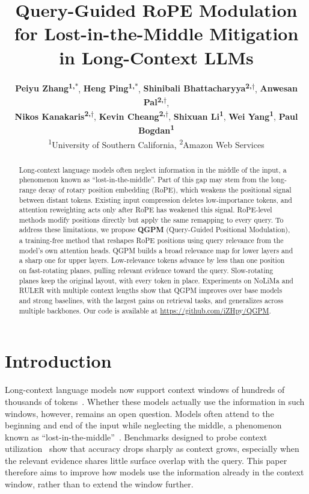 \documentclass[11pt]{article}
\title{Query-Guided RoPE Modulation for Lost-in-the-Middle Mitigation in Long-Context LLMs}
\author{
 \textbf{Peiyu Zhang\textsuperscript{1,$\ast$}},
 \textbf{Heng Ping\textsuperscript{1,$\ast$}},
 \textbf{Shinibali Bhattacharyya\textsuperscript{2,$\dagger$}},
 \textbf{Anwesan Pal\textsuperscript{2,$\dagger$}},
 \\
 \textbf{Nikos Kanakaris\textsuperscript{2,$\dagger$}},
 \textbf{Kevin Cheang\textsuperscript{2,$\dagger$}},
 \textbf{Shixuan Li\textsuperscript{1}},
 \textbf{Wei Yang\textsuperscript{1}},
 \textbf{Paul Bogdan\textsuperscript{1}}
\\
 \textsuperscript{1}University of Southern California,
 \textsuperscript{2}Amazon Web Services
}
\begin{document}
\maketitle
\renewcommand{\thefootnote}{$\ast$}
\renewcommand{\thefootnote}{$\dagger$}
\renewcommand{\thefootnote}{\arabic{footnote}}

\begin{abstract}
Long-context language models often neglect information in the middle of the input, a phenomenon known as ``lost-in-the-middle''. Part of this gap may stem from the long-range decay of rotary position embedding (RoPE), which weakens the positional signal between distant tokens. Existing input compression deletes low-importance tokens, and attention reweighting acts only after RoPE has weakened this signal. RoPE-level methods modify positions directly but apply the same remapping to every query. To address these limitations, we propose \textbf{QGPM} (Query-Guided Positional Modulation), a training-free method that reshapes RoPE positions using query relevance from the model's own attention heads. QGPM builds a broad relevance map for lower layers and a sharp one for upper layers. Low-relevance tokens advance by less than one position on fast-rotating planes, pulling relevant evidence toward the query. Slow-rotating planes keep the original layout, with every token in place. Experiments on NoLiMa and RULER with multiple context lengths show that QGPM improves over base models and strong baselines, with the largest gains on retrieval tasks, and generalizes across multiple backbones. Our code is available at \url{https://github.com/iZHpy/QGPM}.
\end{abstract}

\section{Introduction}

Long-context language models now support context windows of hundreds of thousands of tokens~\citep{achiam2023gpt,grattafiori2024llama,yang2024qwen2}. Whether these models actually use the information in such windows, however, remains an open question. Models often attend to the beginning and end of the input while neglecting the middle, a phenomenon known as ``lost-in-the-middle''~\citep{liu2024lost}. Benchmarks designed to probe context utilization~\citep{modarressi2025nolima,hsieh2024ruler} show that accuracy drops sharply as context grows, especially when the relevant evidence shares little surface overlap with the query. This paper therefore aims to improve how models use the information already in the context window, rather than to extend the window further.
\end{document}
